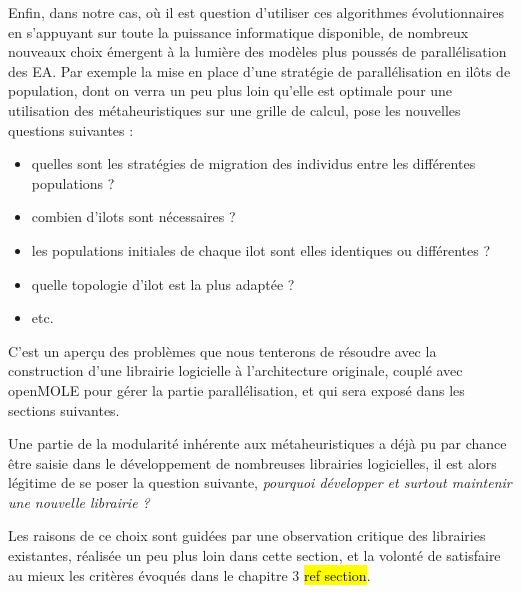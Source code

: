 Enfin, dans notre cas, où il est question d'utiliser ces algorithmes évolutionnaires en s'appuyant sur toute la puissance informatique disponible, de nombreux nouveaux choix \autocite[221-224]{DeJong2006a} émergent à la lumière des modèles plus poussés de parallélisation des EA. Par exemple la mise en place d'une stratégie de parallélisation en ilôts de population, dont on verra un peu plus loin qu'elle est optimale pour une utilisation des métaheuristiques sur une grille de calcul, pose les nouvelles questions suivantes :

\begin{itemize}
	\item quelles sont les stratégies de migration des individus entre les différentes populations ?
	\item combien d'ilots sont nécessaires ?
	\item les populations initiales de chaque ilot sont elles identiques ou différentes ?
	\item quelle topologie d'ilot est la plus adaptée ?
	\item etc.
\end{itemize}

C'est un aperçu des problèmes que nous tenterons de résoudre avec la construction d'une librairie logicielle à l'architecture originale, couplé avec openMOLE pour gérer la partie parallélisation, et qui sera exposé dans les sections suivantes.

Une partie de la modularité inhérente aux métaheuristiques a déjà pu par chance être saisie dans le développement de nombreuses librairies logicielles, il est alors légitime de se poser la question suivante, \textit{pourquoi développer et surtout maintenir une nouvelle librairie ? }

Les raisons de ce choix sont guidées par une observation critique des librairies existantes, réalisée un peu plus loin dans cette section, et la volonté de satisfaire au mieux les critères évoqués dans le chapitre 3 \hl{ref section}.





